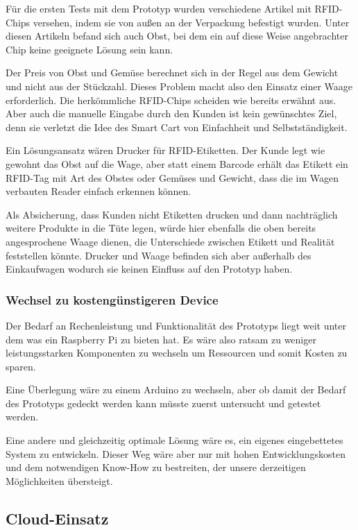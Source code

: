 \documentclass{sigchi}
\begin{document}
Für die ersten Tests mit dem Prototyp wurden verschiedene Artikel mit RFID-Chips versehen, indem sie von außen an der Verpackung befestigt wurden. Unter diesen Artikeln befand sich auch Obst, bei dem ein auf diese Weise angebrachter Chip keine geeignete Lösung sein kann. 

Der Preis von Obst und Gemüse berechnet sich in der Regel aus dem Gewicht und nicht aus der Stückzahl. Dieses Problem macht also den Einsatz einer Waage erforderlich. Die herkömmliche RFID-Chips scheiden wie bereits erwähnt aus. Aber auch die manuelle Eingabe durch den Kunden ist kein gewünschtes Ziel, denn sie verletzt die Idee des Smart Cart von Einfachheit und Selbstständigkeit.

Ein Lösungsansatz wären Drucker für RFID-Etiketten. Der Kunde legt wie gewohnt das Obst auf die Wage, aber statt einem Barcode erhält das Etikett ein RFID-Tag mit Art des Obstes oder Gemüses und Gewicht, dass die im Wagen verbauten Reader einfach erkennen können. 

Als Absicherung, dass Kunden nicht Etiketten drucken und dann nachträglich weitere Produkte in die Tüte legen, würde hier ebenfalls die oben bereits angesprochene Waage dienen, die Unterschiede zwischen Etikett und Realität feststellen könnte. 
Drucker und Waage befinden sich aber außerhalb des Einkaufwagen wodurch sie keinen Einfluss auf den Prototyp haben.


\subsubsection{Wechsel zu kostengünstigeren Device}
Der Bedarf an Rechenleistung und Funktionalität des Prototyps liegt weit unter dem was ein Raspberry Pi zu bieten hat. Es wäre also ratsam zu weniger leistungsstarken Komponenten zu wechseln um Ressourcen und somit Kosten zu sparen.

Eine Überlegung wäre zu einem Arduino zu wechseln, aber ob damit der Bedarf des Prototyps gedeckt werden kann müsste zuerst untersucht und getestet werden.

Eine andere und gleichzeitig optimale Lösung wäre es, ein eigenes eingebettetes System zu entwickeln. Dieser Weg wäre aber nur mit hohen Entwicklungskosten und dem notwendigen Know-How zu bestreiten, der unsere derzeitigen Möglichkeiten übersteigt. 


\subsection{Cloud-Einsatz}
\end{document}
